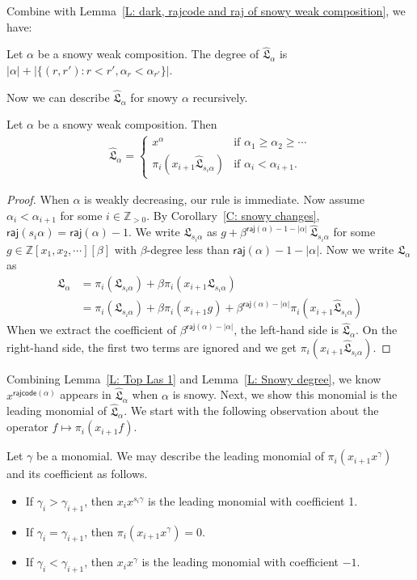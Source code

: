 \documentclass[ALCO]{cedram}
\newcommand{\fL}{\mathfrak{L}}
\newcommand{\fLb}{\fL}
\newcommand{\topLas}{\widehat{\fL}}
\newcommand{\Z}{\mathbb{Z}}
\newcommand{\rajcode}{\mathsf{rajcode}}
\newcommand{\raj}{\mathsf{raj}}
\begin{document}
Combine with Lemma~\ref{L: dark, rajcode and raj of snowy weak composition},
we have: 
\begin{cor}
Let $\alpha$ be a snowy weak composition.
The degree of $\topLas_\alpha$
is $|\alpha| + |\{(r, r'): r < r', \alpha_r < \alpha_{r'}\}|$.
\end{cor}

Now we can describe $\topLas_\alpha$ for snowy 
$\alpha$ recursively.
\begin{lemma}\label{L: recursive top Las}
Let $\alpha$ be a snowy weak composition. 
Then
\begin{align}
\topLas_\alpha = \begin{cases}
x^\alpha & \text{if $\alpha_1 \geqslant \alpha_2 \geqslant \cdots$} \\
\pi_i (x_{i+1} \topLas_{s_i\alpha}) &\text{if $\alpha_i<\alpha_{i+1}$.}
\end{cases}
\end{align}
\end{lemma}
\begin{proof}
When $\alpha$ is weakly decreasing, 
our rule is immediate.
Now assume $\alpha_i < \alpha_{i+1}$ for some $i\in \Z_{>0}$.
By Corollary~\ref{C: snowy changes},
$\raj(s_i \alpha) = \raj(\alpha) - 1$.
We write $\fLb_{s_i \alpha}$
as $g + \beta^{\raj(\alpha) - 1 - |\alpha|} \: \topLas_{s_i \alpha}$
for some $g \in \Z[x_1, x_2, \cdots][\beta]$
with $\beta$-degree less than 
$\raj(\alpha) - 1 - |\alpha|$.
Now we write $\fLb_\alpha$ as
\begin{align*}
\fLb_\alpha & = \pi_i(\fLb_{s_i \alpha}) 
+ \beta \pi_i(x_{i+1}\fLb_{s_i \alpha})  \\ 
& =\pi_i(\fLb_{s_i \alpha})
+ \beta \pi_i(x_{i+1}g) + \beta^{\raj(\alpha) - |\alpha|} \pi_i(x_{i+1}\topLas_{s_i \alpha})   
\end{align*}
When we extract the coefficient of $\beta^{\raj(\alpha) - |\alpha|}$,
the left-hand side is $\topLas_\alpha$.
On the right-hand side, 
the first two terms are ignored and 
we get $\pi_i(x_{i+1}\topLas_{s_i \alpha})$.
\end{proof}

Combining Lemma~\ref{L: Top Las 1} and Lemma~\ref{L: Snowy degree},
we know $x^{\rajcode(\alpha)}$ appears in $\topLas_\alpha$
when $\alpha$ is snowy. 
Next, we show this monomial
is the leading monomial of $\topLas_\alpha$.
We start with the following observation 
about the operator $f \mapsto \pi_i(x_{i+1} f)$.
\begin{rem}
\label{R: leading}
Let $\gamma$ be a monomial.
We may describe the leading monomial of
$\pi_i(x_{i+1}x^\gamma)$ and its coefficient as follows. 
\begin{itemize}
\item If $\gamma_i > \gamma_{i+1}$,
then $x_i x^{s_i \gamma}$ is the leading monomial
with coefficient 1.
\item If $\gamma_i = \gamma_{i+1}$,
then $\pi_i(x_{i+1}x^\gamma) = 0$. 
\item If $\gamma_i < \gamma_{i+1}$,
then $x_i x^\gamma$ is the leading monomial 
with coefficient $-1$. 
\end{itemize}
\end{rem}
\end{document}
